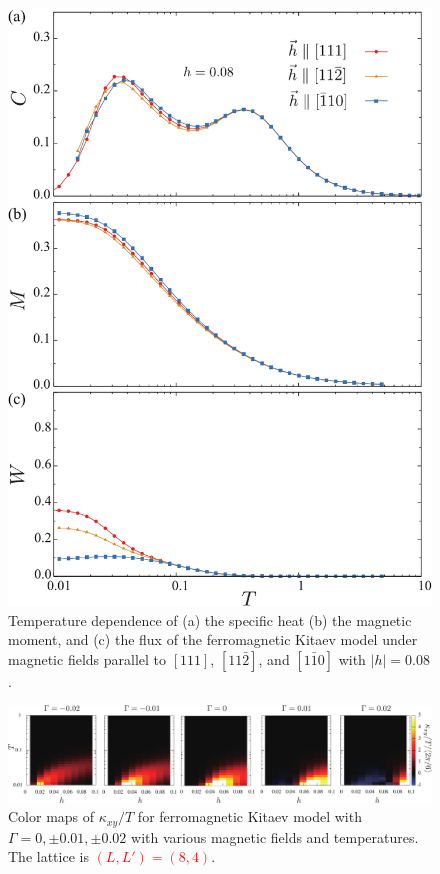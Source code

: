 \documentclass[reprint,amsmath,amssymb,aps,prx]{revtex4-2}
\newcommand{\red}[1]{\textcolor{red}{#1}}
\begin{document}
\begin{figure}
  \begin{center}
    \includegraphics[width=0.9\linewidth]{Figs/plot_CMF_h0.08_ab.pdf}
  \end{center}
  \caption{Temperature dependence of (a) the specific heat (b) the magnetic moment, and (c) the flux of the ferromagnetic Kitaev model under magnetic fields parallel to $[111]$, $[11\bar{2}]$, and $[1\bar{1}0]$ with $|h|=0.08$.}
  \label{fig:CMF_h0.08_ab}
\end{figure}


\begin{figure}
  \begin{center}
    \includegraphics[width=\linewidth]{Figs/color_map_G_XC4.pdf}
  \end{center}
  \caption{Color maps of $\kappa_{xy}/T$ for ferromagnetic Kitaev model with $\Gamma = 0, \pm 0.01, \pm 0.02$ with various magnetic fields and temperatures. The lattice is \red{$(L, L') = (8, 4)$}.}
  \label{fig:color_map_G_XC4}
\end{figure}
\end{document}
